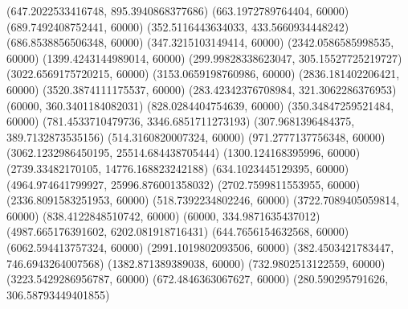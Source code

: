 {(647.2022533416748, 895.3940868377686) %
(663.1972789764404, 60000) %
(689.7492408752441, 60000) %
(352.5116443634033, 433.5660934448242) %
(686.8538856506348, 60000) %
(347.3215103149414, 60000) %
(2342.0586585998535, 60000) %
(1399.4243144989014, 60000) %
(299.99828338623047, 305.15527725219727) %
(3022.6569175720215, 60000) %
(3153.0659198760986, 60000) %
(2836.181402206421, 60000) %
(3520.3874111175537, 60000) %
(283.42342376708984, 321.3062286376953) %
(60000, 360.3401184082031) %
(828.0284404754639, 60000) %
(350.34847259521484, 60000) %
(781.4533710479736, 3346.6851711273193) %
(307.9681396484375, 389.7132873535156) %
(514.3160820007324, 60000) %
(971.2777137756348, 60000) %
(3062.1232986450195, 25514.684438705444) %
(1300.124168395996, 60000) %
(2739.33482170105, 14776.168823242188) %
(634.1023445129395, 60000) %
(4964.974641799927, 25996.876001358032) %
(2702.7599811553955, 60000) %
(2336.8091583251953, 60000) %
(518.7392234802246, 60000) %
(3722.7089405059814, 60000) %
(838.4122848510742, 60000) %
(60000, 334.9871635437012) %
(4987.665176391602, 6202.081918716431) %
(644.7656154632568, 60000) %
(6062.594413757324, 60000) %
(2991.1019802093506, 60000) %
(382.4503421783447, 746.6943264007568) %
(1382.871389389038, 60000) %
(732.9802513122559, 60000) %
(3223.5429286956787, 60000) %
(672.4846363067627, 60000) %
(280.590295791626, 306.58793449401855) %
}
